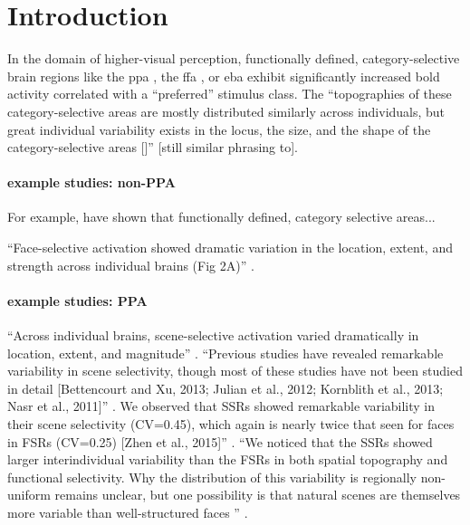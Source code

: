 



\section{Introduction}

In the domain of higher-visual perception, functionally defined,
category-selective brain regions like the \ac{ppa} \citep{epstein1998ppa}, the
\ac{ffa} \citep{kanwisher1997ffa}, or \ac{eba} \citep{downing2001bodyarea}
exhibit significantly increased \ac{bold} activity correlated with a
``preferred'' \citep{debeck2008interpreting} stimulus class.
The ``topographies of these category-selective areas are mostly distributed
similarly across individuals, but great individual variability exists in the
locus, the size, and the shape of the category-selective areas
[\citep{rosenke2021probabilistic, zhen2017quantifying, zhen2015quantifying,
frost2012measuring}]'' [still similar phrasing to\citep{jiahui2020predicting}].


\paragraph{example studies: non-PPA}
For example, \citep{rosenke2021probabilistic, frost2012measuring,
zhen2017quantifying, zhen2015quantifyingi} have shown that functionally defined,
category selective areas...

``Face-selective activation showed dramatic variation in the location, extent,
and strength across individual brains (Fig 2A)'' \citet{zhen2015quantifying}.


\paragraph{example studies: PPA}
%
``Across individual brains, scene-selective activation varied dramatically in
location, extent, and magnitude'' \citep{zhen2017quantifying}.
%
``Previous studies have revealed remarkable variability in scene selectivity,
though most of these studies have not been studied in detail [Bettencourt and
Xu, 2013; Julian et al., 2012; Kornblith et al., 2013; Nasr et al., 2011]''
\citep{zhen2017quantifying}.
%
We observed that SSRs showed remarkable variability in their scene selectivity
(CV=0.45), which again is nearly twice that seen for faces in FSRs (CV=0.25)
[Zhen et al., 2015]'' \citep{zhen2017quantifying}.
%
``We noticed that the SSRs showed larger interindividual variability than the
FSRs in both spatial topography and functional selectivity.
%
Why the distribution of this variability is regionally non-uniform remains
unclear, but one possibility is that natural scenes are themselves more variable
than well-structured faces '' \citep{zhen2017quantifying}.

